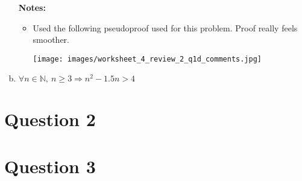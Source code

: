 \documentclass[12pt]{article}
\begin{document}
\begin{enumerate}[a.]
    \bigskip

    \textbf{Notes:}

    \begin{itemize}
        \item Used the following pseudoproof used for this problem. Proof really
        feels smoother.

        \begin{center}
        \texttt{[image: images/worksheet\_4\_review\_2\_q1d\_comments.jpg]}
        \end{center}

    \end{itemize}

    \item

    $\forall n \in \mathbb{N},\:n \geq 3 \Rightarrow n^2 - 1.5n > 4$

\end{enumerate}

\section*{Question 2}

\section*{Question 3}
\end{document}
